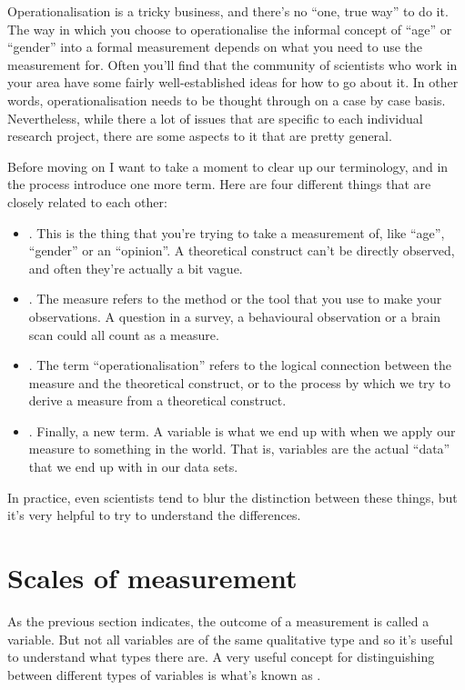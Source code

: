 Operationalisation is a tricky business, and there's no ``one, true way'' to do it. The way in which you choose to operationalise the informal concept of ``age'' or ``gender'' into a formal measurement depends on what you need to use the measurement for. Often you'll find that the community of scientists who work in your area have some fairly well-established ideas for how to go about it. In other words, operationalisation needs to be thought through on a case by case basis. Nevertheless, while there a lot of issues that are specific to each individual research project, there are some aspects to it that are pretty general. 

Before moving on I want to take a moment to clear up our terminology, and in the process introduce one more term. Here are four different things that are closely related to each other:

\begin{itemize}
\item {}. This is the thing that you're trying to take a measurement of, like ``age'', ``gender'' or an ``opinion''. A theoretical construct can't be directly observed, and often they're actually a bit vague. 
\item {}. The measure refers to the method or the tool that you use to make your observations. A question in a survey, a behavioural observation or a brain scan could all count as a measure. 
\item {}. The term ``operationalisation'' refers to the logical connection between the measure and the theoretical construct, or to the process by which we try to derive a measure from a theoretical construct.
\item {}. Finally, a new term. A variable is what we end up with when we apply our measure to something in the world. That is, variables are the actual ``data'' that we end up with in our data sets.
\end{itemize}

\noindent
In practice, even scientists tend to blur the distinction between these things, but it's very helpful to try to understand the differences.

\section{Scales of measurement\label{sec:scales}}

As the previous section indicates, the outcome of a measurement is called a variable. But not all variables are of the same qualitative type and so it's useful to understand what types there are. A very useful concept for distinguishing between different types of variables is what's known as . 


